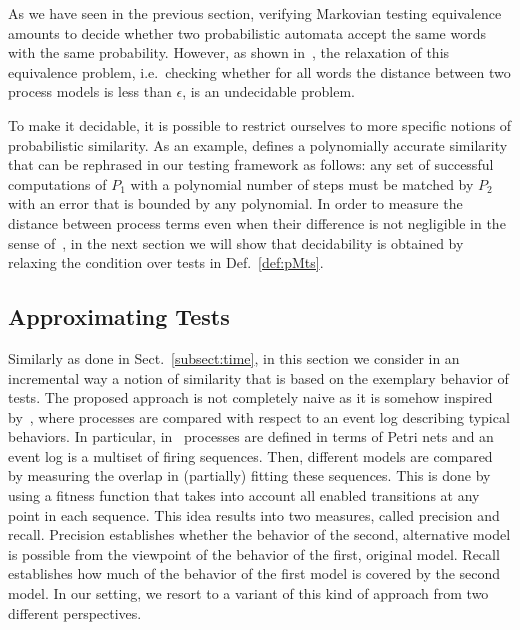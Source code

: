 \documentclass[copyright,creativecommons]{eptcs}
\begin{document}
As we have seen in the previous section, verifying Markovian testing equivalence amounts to decide whether two probabilistic 
automata accept the same words with the same probability. However, as shown in~\cite{dRT}, the relaxation of this equivalence
problem, i.e.\ checking whether for all words the distance between two process models is less than $\epsilon$, is an
undecidable problem.

To make it decidable, it is possible to restrict ourselves to more specific notions of probabilistic similarity. 
As an example, \cite{ST} defines a polynomially accurate similarity that can be rephrased in our testing framework as follows: any 
set of successful computations of $P_1$ with a polynomial number of steps must be matched by $P_2$ with an error that is bounded 
by any polynomial. In order to measure the distance between process terms even when their difference is not negligible in the sense
of~\cite{ST}, in the next section we will show that decidability is obtained by relaxing the condition over tests in Def.~\ref{def:pMts}.

\subsection{Approximating Tests}\label{subsect:test}

Similarly as done in Sect.~\ref{subsect:time}, in this section we consider in an incremental way a notion of similarity that is based 
on the exemplary behavior of tests. The proposed approach is not completely naive as it is somehow inspired by~\cite{AAW}, where processes 
are compared with respect to an event log describing typical behaviors. In particular, in~\cite{AAW} processes are defined in terms of 
Petri nets and an event log is a multiset of firing sequences. Then, different models are compared by measuring the overlap in (partially) 
fitting these sequences. 
This is done by using a fitness function that takes into account all enabled transitions at any point in each sequence. 
This idea results into two measures, called precision and recall. Precision establishes whether the behavior of the second, 
alternative model is possible from the viewpoint of the behavior of the first, original model. Recall establishes how much of 
the behavior of the first model is covered by the second model. 
In our setting, we resort to a variant of this kind of approach from two different perspectives. 
\end{document}

